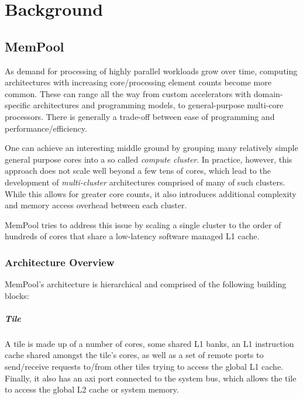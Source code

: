 \chapter{Background}
\label{ch:background}

\section{MemPool}
\label{sec:mempool}

As demand for processing of highly parallel workloads grow over time, computing architectures
with increasing core/processing element counts become more common. These can range all the way
from custom accelerators with domain-specific architectures and programming models, to
general-purpose multi-core processors. There is generally a trade-off between ease of programming
and performance/efficiency.

One can achieve an interesting middle ground by grouping many relatively simple general purpose
cores into a so called \emph{compute cluster}. In practice, however, this approach does not scale
well beyond a few tens of cores, which lead to the development of \emph{multi-cluster} architectures
comprised of many of such clusters. While this allows for greater core counts, it also introduces
additional complexity and memory access overhead between each cluster.

MemPool tries to address this issue by scaling a single cluster to the order of hundreds of cores
that share a low-latency software managed L1 cache.

\subsection{Architecture Overview}
\label{subsec:mempool_architecture}


MemPool's architecture is hierarchical and comprised of the following building blocks:

\paragraph{Tile} A tile is made up of a number of cores, some shared L1 banks, an L1 instruction
cache shared amongst the tile's cores, as well as a set of remote ports to send/receive requests
to/from other tiles trying to access the global L1 cache. Finally, it also has an \gls{axi} port
connected to the system bus, which allows the tile to access the global L2 cache or system memory.

